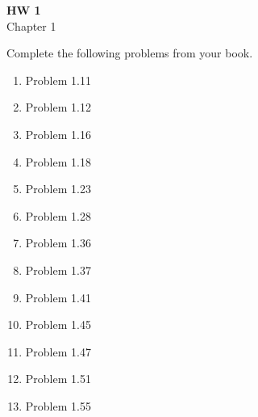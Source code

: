 \documentclass{article}
\begin{document}
\fancyfoot[C]{\thepage}
\vspace*{0cm}
\begin{center}
	{\LARGE \textbf{HW 1}}\\
	\vspace{.25cm}
	{\Large Chapter 1}
\end{center}

Complete the following problems from your book.

\begin{enumerate}
	\item Problem 1.11
	\item Problem 1.12
	\item Problem 1.16
	\item Problem 1.18
	\item Problem 1.23
	\item Problem 1.28
	\item Problem 1.36
	\item Problem 1.37
	\item Problem 1.41
	\item Problem 1.45
	\item Problem 1.47
	\item Problem 1.51
	\item Problem 1.55
\end{enumerate}
\end{document}
